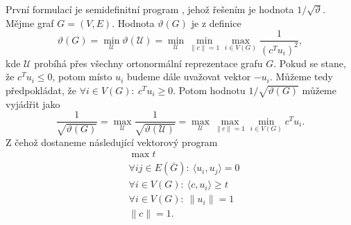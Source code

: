První formulací je semidefinitní program \cite{approximation-algorithms-and-semidefinite-programming}, jehož řešením je hodnota $1/\sqrt{\vartheta}$. Mějme graf $G = (V,E)$. Hodnota $\vartheta(G)$ je z definice
$$
    \vartheta(G) = \min_\mathcal{U} \vartheta(\mathcal{U}) = \min_\mathcal{U} \min_{\|c\|=1} \max_{i \in V(G)} \frac{1}{\left( c^T u_i \right)^2},
$$
kde $\mathcal{U}$ probíhá přes všechny ortonormální reprezentace grafu $G$. Pokud se stane, že $c^T u_i \leq 0$, potom místo $u_i$ budeme dále uvažovat vektor $-u_i$. Můžeme tedy předpokládat, že $\forall i \in V(G):\ c^T u_i \geq 0$. Potom hodnotu $1/\sqrt{\vartheta(G)}$ můžeme vyjádřit jako
$$
    \frac{1}{\sqrt{\vartheta(G)}} = \max_\mathcal{U} \frac{1}{\sqrt{\vartheta(\mathcal{U})}} = \max_\mathcal{U} \max_{\|c\|=1} \min_{i \in V(G)} c^T u_i.
$$
Z čehož dostaneme následující vektorový program
\begin{equation}\tag{VP1}
    \begin{split}
        &\max t \\
        &\forall ij \in E(\bar{G}):\ \langle u_i, u_j \rangle = 0 \\
        &\forall i \in V(G):\ \langle c, u_i \rangle \geq t \\
        &\forall i \in V(G):\ \| u_i \| = 1 \\
        &\| c \| = 1.
    \end{split}
    \label{eq:VP1}
\end{equation}

